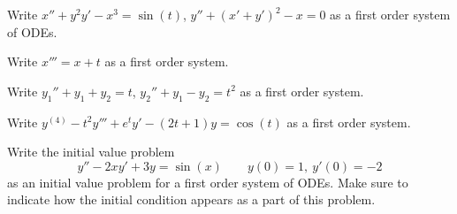 \documentclass{ximera}
\begin{document}
\begin{exercise}
    Write $x'' + y^2 y' - x^3 = \sin(t)$, $y'' + {(x'+y')}^2 -x = 0$ as a first order system of ODEs.
\end{exercise}

\begin{exercise}%
    Write $x''' = x+t$ as a first order system.
\end{exercise}

\begin{exercise}%
    Write $y_1'' + y_1 + y_2 = t$, $y_2'' + y_1 - y_2 = t^2$ as a first order system.
\end{exercise}

\begin{exercise}
    Write $y^{(4)} - t^2 y''' + e^t y' - (2t+1)y = \cos(t)$ as a first order system.
\end{exercise}

\begin{exercise}
    Write the initial value problem 
    \[ 
        y'' - 2xy' + 3y = \sin(x) \qquad y(0) = 1,\ y'(0) = -2 
    \] 
    as an initial value problem for a first order system of ODEs. Make sure to indicate how the initial condition appears as a part of this problem. 
\end{exercise}
\end{document}
